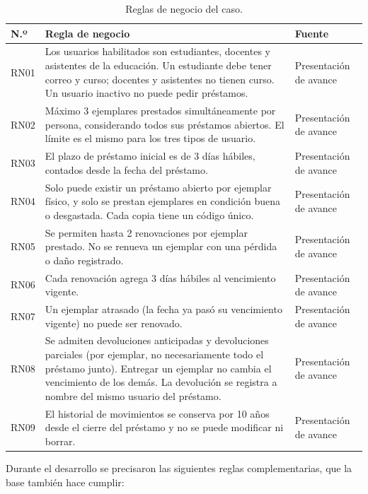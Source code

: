 \documentclass[11pt,a4paper]{article}
\begin{document}
\begin{table}[H]
\centering
\caption{Reglas de negocio del caso.}
\begin{tabularx}{\textwidth}{l Y Y}
\toprule
\textbf{N.º} & \textbf{Regla de negocio} & \textbf{Fuente}\\
\midrule
RN01 & Los usuarios habilitados son estudiantes, docentes y asistentes de la educación. Un estudiante debe tener correo y curso; docentes y asistentes no tienen curso. Un usuario inactivo no puede pedir préstamos. &Presentación de avance\\
RN02 & Máximo 3 ejemplares prestados simultáneamente por persona, considerando todos sus préstamos abiertos. El límite es el mismo para los tres tipos de usuario. & Presentación de avance\\
RN03 & El plazo de préstamo inicial es de 3 días hábiles, contados desde la fecha del préstamo. &Presentación de avance\\
RN04 & Solo puede existir un préstamo abierto por ejemplar físico, y solo se prestan ejemplares en condición buena o desgastada. Cada copia tiene un código único. &Presentación de avance\\
RN05 & Se permiten hasta 2 renovaciones por ejemplar prestado. No se renueva un ejemplar con una pérdida o daño registrado. &Presentación de avance\\
RN06 & Cada renovación agrega 3 días hábiles al vencimiento vigente. &Presentación de avance\\
RN07 & Un ejemplar atrasado (la fecha ya pasó su vencimiento vigente) no puede ser renovado. &Presentación de avance\\
RN08 & Se admiten devoluciones anticipadas y devoluciones parciales (por ejemplar, no necesariamente todo el préstamo junto). Entregar un ejemplar no cambia el vencimiento de los demás. La devolución se registra a nombre del mismo usuario del préstamo. &Presentación de avance\\
RN09 & El historial de movimientos se conserva por 10 años desde el cierre del préstamo y no se puede modificar ni borrar. &Presentación de avance\\
\bottomrule
\end{tabularx}
\end{table}

Durante el desarrollo se precisaron las siguientes reglas complementarias, que la base también hace cumplir:
\end{document}

